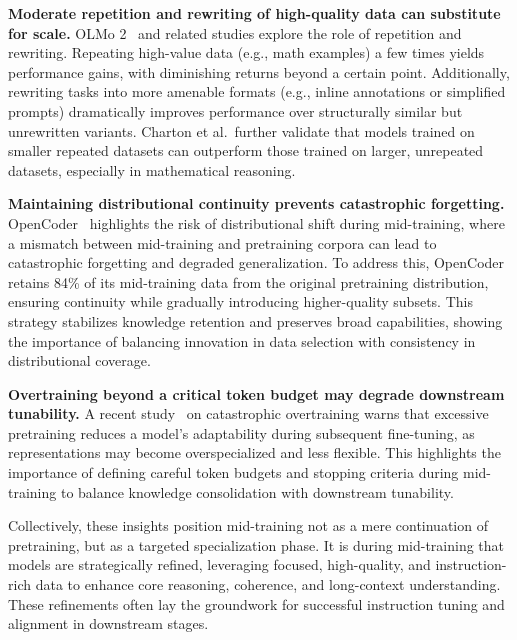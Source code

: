 \noindent\textbf{Moderate repetition and rewriting of high-quality data can substitute for scale.}
OLMo 2~\cite{olmo20242} and related studies explore the role of repetition and rewriting. Repeating high-value data (e.g., math examples) a few times yields performance gains, with diminishing returns beyond a certain point. Additionally, rewriting tasks into more amenable formats (e.g., inline annotations or simplified prompts) dramatically improves performance over structurally similar but unrewritten variants. Charton et al.\ further validate that models trained on smaller repeated datasets can outperform those trained on larger, unrepeated datasets, especially in mathematical reasoning.

\noindent\textbf{Maintaining distributional continuity prevents catastrophic forgetting.}
OpenCoder~\cite{huang2024opencoder} highlights the risk of distributional shift during mid-training, where a mismatch between mid-training and pretraining corpora can lead to catastrophic forgetting and degraded generalization. To address this, OpenCoder retains 84\% of its mid-training data from the original pretraining distribution, ensuring continuity while gradually introducing higher-quality subsets. This strategy stabilizes knowledge retention and preserves broad capabilities, showing the importance of balancing innovation in data selection with consistency in distributional coverage.

\noindent\textbf{Overtraining beyond a critical token budget may degrade downstream tunability.}
A recent study~\cite{springer2025overtrained} on catastrophic overtraining warns that excessive pretraining reduces a model’s adaptability during subsequent fine-tuning, as representations may become overspecialized and less flexible. This highlights the importance of defining careful token budgets and stopping criteria during mid-training to balance knowledge consolidation with downstream tunability.

Collectively, these insights position mid-training not as a mere continuation of pretraining, but as a targeted specialization phase.
It is during mid-training that models are strategically refined, leveraging focused, high-quality, and instruction-rich data to enhance core reasoning, coherence, and long-context understanding. These refinements often lay the groundwork for successful instruction tuning and alignment in downstream stages.

